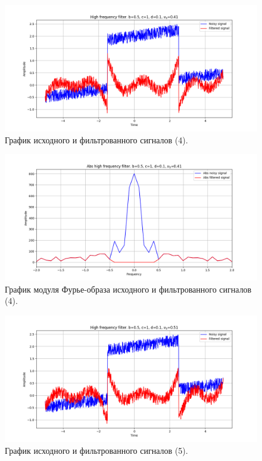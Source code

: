 \documentclass[a4paper, 12pt]{article}
\begin{document}
    \begin{figure}[!htb]
        \centering
        \includegraphics[scale=0.48]{4_u_flt_u_nolow.png}
        \captionsetup{skip=0pt}
        \caption{График исходного и фильтрованного сигналов (4).}
        \label{fig:fig33}
    \end{figure}
    \begin{figure}[!htb]
        \centering
        \includegraphics[scale=0.48]{4_abs_u_U_nolow.png}
        \captionsetup{skip=0pt}
        \caption{График модуля Фурье-образа исходного и фильтрованного сигналов (4).}
        \label{fig:fig34}
    \end{figure}
    \newpage
    \begin{figure}[!htb]
        \centering
        \includegraphics[scale=0.48]{5_u_flt_u_nolow.png}
        \captionsetup{skip=0pt}
        \caption{График исходного и фильтрованного сигналов (5).}
        \label{fig:fig35}
    \end{figure}
\end{document}
